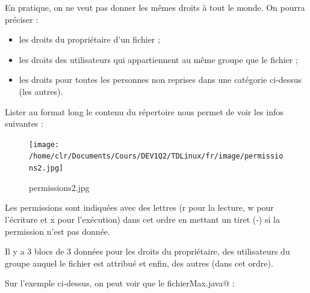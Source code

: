 \documentclass[11pt,a4paper]{article}
\begin{document}
            \par
        
				  En pratique, on ne veut pas donner les m\^emes droits \`a tout le monde. On pourra pr\'eciser :
				  
					\begin{itemize}
				
			\item les droits du propri\'etaire d'un fichier ;
			\item les droits des utilisateurs qui appartiennent au m\^eme groupe que le fichier ;
			\item les droits pour toutes les personnes non reprises dans une cat\'egorie ci-dessus (les autres).
					\end{itemize}
				
            \par
        
				  Lister au format long le contenu du r\'epertoire nous permet de voir les infos suivantes :
				
            \par
        \begin{figure}[hbt]
				    \begin{center}
					\texttt{[image: /home/clr/Documents/Cours/DEV1Q2/TDLinux/fr/image/permissions2.jpg]}
						\end{center}
                
                    \caption[permissions2.jpg]{permissions2.jpg}
                \end{figure}
                    
            \par
        
          Les permissions sont indiqu\'ees avec des lettres (r pour la lecture, w pour l'\'ecriture et x pour l'ex\'ecution) 
          dans cet ordre en mettant un tiret (-) si la permission n'est pas donn\'ee. 
        
            \par
        
          Il y a 3 blocs de 3 donn\'ees pour les droits du propri\'etaire, des utilisateurs du groupe auquel le fichier est attribu\'e et enfin, des autres (dans cet ordre).
        
            \par
        
          Sur l'exemple ci-dessus, on peut voir que le fichier\verb@ Max.java@ :
          
\end{document}
